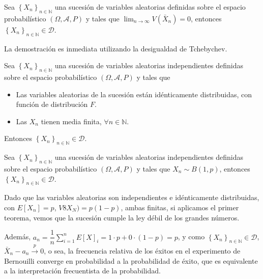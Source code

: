 \begin{teorema}[Markov]
Sea $ \left\{X_n\right\}_{n\in\mathbb{N}}$ una sucesi\'on de variables aleatorias definidas sobre el espacio probabil\'istico $\left(\Omega,\mathcal{A}, P\right) $ y tales que $\lim_{n\to\infty}V(\bar{X}_n)=0$, entonces $ \left\{X_n\right\}_{n\in\mathbb{N}}\in\mathscr{D}$.
\end{teorema}

La demostraci\'on es inmediata utilizando la desigualdad de Tchebychev.

\begin{teorema}[Khintchine]
Sea $ \left\{X_n\right\}_{n\in\mathbb{N}}$ una sucesi\'on de variables aleatorias independientes definidas sobre el espacio probabil\'istico $\left(\Omega,\mathcal{A}, P\right) $ y tales que 
\begin{itemize}
\item Las variables aleatorias de la sucesi\'on est\'an id\'enticamente distribuidas, con funci\'on de distribuci\'on $F$.
\item Las $X_n$ tienen media finita, $\forall n\in\mathbb{N}$.
\end{itemize}
Entonces $ \left\{X_n\right\}_{n\in\mathbb{N}}\in\mathscr{D}$.
\end{teorema}

\begin{teorema}
Sea $ \left\{X_n\right\}_{n\in\mathbb{N}}$ una sucesi\'on de variables aleatorias independientes definidas sobre el espacio probabil\'istico $\left(\Omega,\mathcal{A}, P\right) $ y tales que $X_n\sim B(1,p)$, entonces $ \left\{X_n\right\}_{n\in\mathbb{N}}\in\mathscr{D}$.
\end{teorema}

Dado que las variables aleatorias son independientes e id\'enticamente distribuidas, con $E[X_n]=p$, $V8X_N)=p(1-p)$, ambas finitas, si aplicamos el primer teorema, vemos que la sucesi\'on cumple la ley d\'ebil de los grandes n\'umeros.

Adem\'as, $a_n=\dfrac{1}{n}\sum_{i=1}^{n}E[X]_i=1\cdot p + 0\cdot(1-p)=p$, y como $ \left\{X_n\right\}_{n\in\mathbb{N}}\in\mathscr{D}$, $ \bar{X}_n-a_n\overset{p}{\to} 0$, o sea, la frecuencia relativa de los \'exitos en el experimento de Bernouilli converge en probabilidad a la probabilidad de \'exito, que es equivalente a la interpretaci\'on frecuentista de la probabilidad.


